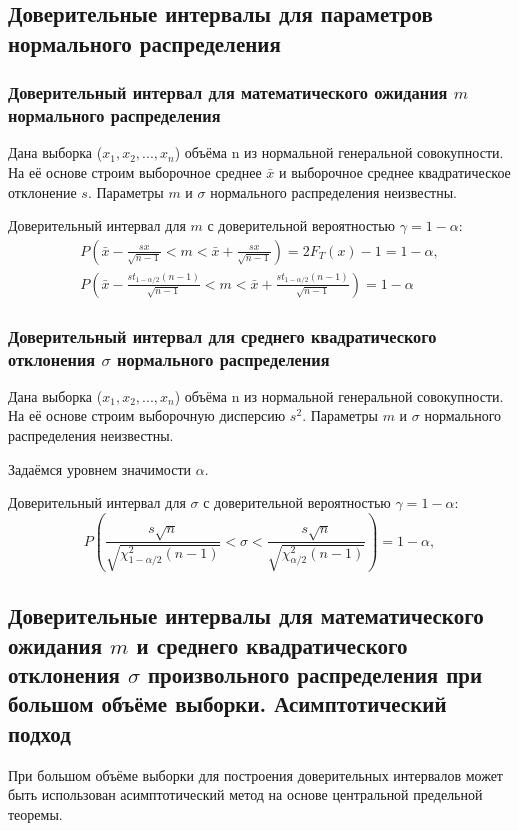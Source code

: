 \subsection{Доверительные интервалы для параметров нормального распределения}
	\subsubsection{Доверительный интервал для математического ожидания $m$ нормального распределения}
	Дана выборка ($x_{1},x_{2}, ... ,x_{n}$) объёма n из нормальной генеральной совокупности. На её основе строим выборочное среднее $\bar{x}$ и выборочное среднее квадратическое отклонение $s$. Параметры $m$ и $\sigma$ нормального распределения неизвестны.

    Доверительный интервал для $m$ с доверительной вероятностью $\gamma = 1-\alpha$:
    \begin{equation}
        \begin{split}
             P\left(\bar{x} - \frac{sx}{\sqrt{n-1}} < m <  \bar{x} + \frac{sx}{\sqrt{n-1}}\right) = 2F_{T}(x) - 1 = 1 - \alpha,  \\
             P\left(\bar{x} - \frac{st_{1-\alpha/2}(n-1)}{\sqrt{n-1}} < m <  \bar{x} + \frac{st_{1-\alpha/2}(n-1)}{\sqrt{n-1}}\right)= 1 - \alpha
        \end{split}
        \label{eq:P_m}
    \end{equation}

    \subsubsection{Доверительный интервал для среднего квадратического отклонения $\sigma$ нормального распределения}
    Дана выборка ($x_{1},x_{2}, ... ,x_{n}$) объёма n из нормальной генеральной совокупности. На её основе строим выборочную дисперсию $s^{2}$. Параметры $m$ и $\sigma$ нормального распределения неизвестны.

    Задаёмся уровнем значимости $\alpha$.

    Доверительный интервал для $\sigma$ с доверительной вероятностью $\gamma = 1 - \alpha$:
    \begin{equation}
         P\left(\frac{s\sqrt{n}}{\sqrt{\chi^{2}_{1-\alpha/2}(n-1)}} < \sigma <  \frac{s\sqrt{n}}{\sqrt{\chi^{2}_{\alpha/2}(n-1)}}\right) = 1- \alpha,
         \label{eq:fin_interval}
    \end{equation}

    \subsection{Доверительные интервалы для математического ожидания $m$ и среднего квадратического отклонения $\sigma$ произвольного распределения при большом объёме выборки. Асимптотический подход}
    При большом объёме выборки для построения доверительных интервалов может быть использован асимптотический метод на основе центральной предельной теоремы.
